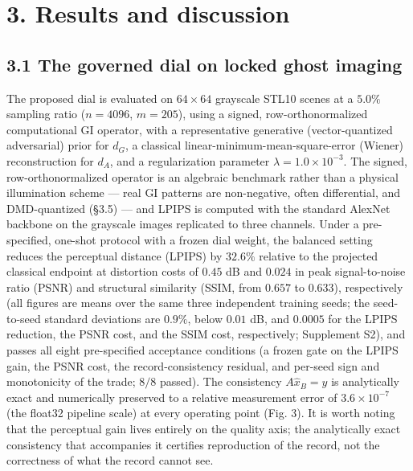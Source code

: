 \documentclass[11pt]{article}
\begin{document}
\section*{3. Results and discussion}

\subsection*{3.1 The governed dial on locked ghost imaging}

The proposed dial is evaluated on $64\times64$ grayscale STL10 scenes at a $5.0\%$ sampling ratio ($n = 4096$, $m = 205$), using a signed, row-orthonormalized computational GI operator, with a representative generative (vector-quantized adversarial) prior for $d_G$, a classical linear-minimum-mean-square-error (Wiener) reconstruction for $d_A$, and a regularization parameter $\lambda = 1.0\times10^{-3}$. The signed, row-orthonormalized operator is an algebraic benchmark rather than a physical illumination scheme --- real GI patterns are non-negative, often differential, and DMD-quantized (§3.5) --- and LPIPS is computed with the standard AlexNet backbone on the grayscale images replicated to three channels. Under a pre-specified, one-shot protocol with a frozen dial weight, the balanced setting reduces the perceptual distance (LPIPS) by $32.6\%$ relative to the projected classical endpoint at distortion costs of $0.45$ dB and $0.024$ in peak signal-to-noise ratio (PSNR) and structural similarity (SSIM, from $0.657$ to $0.633$), respectively (all figures are means over the same three independent training seeds; the seed-to-seed standard deviations are $0.9\%$, below $0.01$ dB, and $0.0005$ for the LPIPS reduction, the PSNR cost, and the SSIM cost, respectively; Supplement S2), and passes all eight pre-specified acceptance conditions (a frozen gate on the LPIPS gain, the PSNR cost, the record-consistency residual, and per-seed sign and monotonicity of the trade; $8/8$ passed). The consistency $A\hat{x}_B = y$ is analytically exact and numerically preserved to a relative measurement error of $3.6\times10^{-7}$ (the float32 pipeline scale) at every operating point (Fig. 3). It is worth noting that the perceptual gain lives entirely on the quality axis; the analytically exact consistency that accompanies it certifies reproduction of the record, not the correctness of what the record cannot see.
\end{document}
